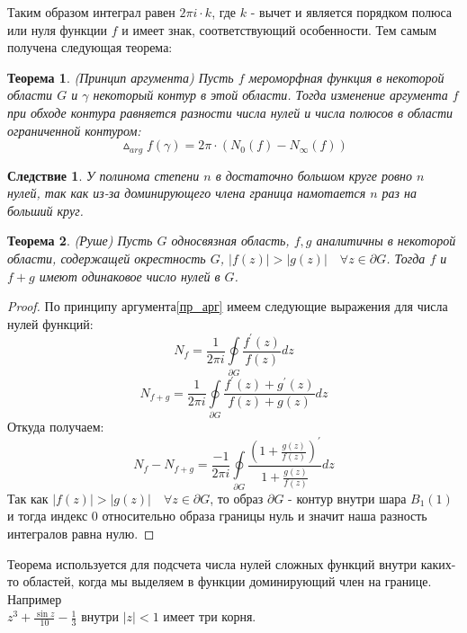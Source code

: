 \documentclass[12pt,a4paper]{article} %
\newtheorem{theorem}{Теорема}
\newtheorem{consequence}{Следствие}
\begin{document}
	Таким образом интеграл равен $2\pi i\cdot k$, где $k$ - вычет и является порядком полюса или нуля функции $f$ и имеет знак, соответствующий особенности. Тем самым получена следующая теорема:
	\begin{theorem}\label{пр_арг}
		(Принцип аргумента) Пусть $f$ мероморфная функция в некоторой области $G$ и $\gamma$ некоторый контур в этой области. Тогда изменение аргумента $f$ при обходе контура равняется разности числа нулей и числа полюсов в области ограниченной контуром:
		$$\vartriangle_{arg}f(\gamma)=2\pi\cdot(N_0(f)-N_{\infty}(f))$$
	\end{theorem}
	\begin{consequence}
		У полинома степени $n$ в достаточно большом круге ровно $n$ нулей, так как из-за доминирующего члена граница намотается $n$ раз на больший круг.
	\end{consequence}
	\begin{theorem}\label{т_Руше}
		(Руше) Пусть $G$ односвязная область, $f,g$ аналитичны в некоторой области, содержащей окрестность $G$, $|f(z)|>|g(z)| \quad\forall z\in \partial G$. Тогда $f$ и $f+g$ имеют одинаковое число нулей в $G$.
	\end{theorem}
	\begin{proof}
		 По принципу аргумента\eqref{пр_арг} имеем следующие выражения для числа нулей функций:
		 $$N_f=\displaystyle\frac{1}{2\pi i}\oint\limits_{\partial G}\frac{f^{'}(z)}{f(z)}dz$$
		 $$N_{f+g}=\displaystyle\frac{1}{2\pi i}\oint\limits_{\partial G}\frac{f^{'}(z)+g^{'}(z)}{f(z)+g(z)}dz$$
		 Откуда получаем:
		 $$N_f-N_{f+g}=\displaystyle\frac{-1}{2\pi i}\oint\limits_{\partial G}\frac{\left(1+\frac{g(z)}{f(z)}\right)^{'}}{1+\frac{g(z)}{f(z)}}dz$$
		 Так как $|f(z)|>|g(z)| \quad\forall z\in \partial G$, то образ $\partial G$ - контур внутри шара $B_1(1)$ и тогда индекс 0 относительно образа границы нуль и значит наша разность интегралов равна нулю.
	\end{proof}
	Теорема используется для подсчета числа нулей сложных функций внутри каких-то областей, когда мы выделяем в функции доминирующий член на границе. Например \\$z^3+\frac{\sin z}{10}-\frac{1}{3}$ внутри $|z|<1$ имеет три корня.
\end{document}
